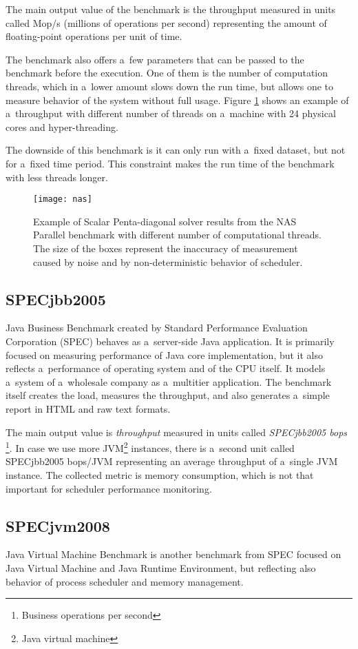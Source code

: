 The main output value of the benchmark is the throughput measured in units
called Mop/s (millions of operations per second) representing the amount of
floating-point operations per unit of time.

The benchmark also offers a~few parameters that can be passed to the benchmark
before the execution. One of them is the number of computation threads, which in
a~lower amount slows down the run time, but allows one to measure behavior of
the system without full usage. Figure \ref{fig:nas} shows an example of
a~throughput with different number of threads on a~machine with 24 physical cores
and hyper-threading.

The downside of this benchmark is it can only run with a~fixed dataset, but not
for a~fixed time period. This constraint makes the run time of the benchmark
with less threads longer.

\begin{figure}
  \centering
  \texttt{[image: nas]}
  \caption{Example of Scalar Penta-diagonal solver results from the NAS Parallel
    benchmark with different number of computational threads. The size of the
    boxes represent the inaccuracy of measurement caused by noise and by
    non-deterministic behavior of scheduler.}
  \label{fig:nas}
\end{figure}

\subsection{SPECjbb2005}
Java Business Benchmark\;\cite{jbb2005} created by Standard Performance
Evaluation Corporation (SPEC) behaves as a~server-side Java application. It is
primarily focused on measuring performance of Java core implementation, but it
also reflects a~performance of operating system and of the CPU itself. It models
a~system of a~wholesale company as a~multitier application. The benchmark itself
creates the load, measures the throughput, and also generates a~simple report in
HTML and raw text formats.

The main output value is \emph{throughput} measured in units called
\emph{SPECjbb2005 bops} \footnote{Business operations per second}. In case we
use more JVM\footnote{Java virtual machine} instances, there is a~second unit
called SPECjbb2005 bops/JVM representing an average throughput of a~single JVM
instance. The collected metric is memory consumption, which is not that
important for scheduler performance monitoring.

\subsection{SPECjvm2008}
Java Virtual Machine Benchmark\;\cite{jvm2008} is another benchmark from SPEC
focused on Java Virtual Machine and Java Runtime Environment, but reflecting
also behavior of process scheduler and memory management.

